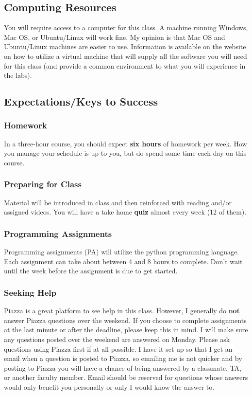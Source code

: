 \documentclass[11pt]{article}
\begin{document}
\subsection{Computing Resources}
You will require access to a computer for this class.  A machine running Windows, Mac OS, or 
Ubuntu/Linux will work fine.  My opinion is that Mac OS and Ubuntu/Linux machines are easier
to use. Information is available on the website on how to utilize a virtual machine that will
supply all the software you will need for this class (and provide a common 
environment to what you will experience in the labs). 

\newpage 

\subsection{Expectations/Keys to Success}
\subsubsection{Homework}
 In a three-hour course, you should expect \textbf{six hours} of homework per week.
 How you manage your schedule is up to you, but do spend some time each day on this course. 

\subsubsection{Preparing for Class}
Material will be introduced in class and 
then reinforced with reading and/or assigned videos.  
You will have a take home \textbf{quiz} almost every week (12 of them).

\subsubsection{Programming Assignments} 
Programming assignments (PA) will utilize the python programming language.  
Each assignment can take about between 4 and 8 hours to complete.
Don't wait until the week before the assignment is due to get started. 

\subsubsection{Seeking Help}
Piazza is a great platform to see help in this class.  However, I generally
 do {\bf not} answer Piazza questions over the weekend.
If  you  choose  to  complete  assignments  at  the  last  minute  or  after  the deadline, 
please keep this in mind.  I will make sure
any questions posted over the weekend are answered on Monday.  
Please ask questions using Piazza first if at all possible. I have it set up so that I get an email 
when a question is posted to Piazza, 
so emailing me is not quicker and by posting to Piazza you will have a chance of being answered by a classmate, 
TA, or another faculty member.  Email should be reserved for questions whose answers
would only benefit you personally or only I would know the answer to.
\end{document}

